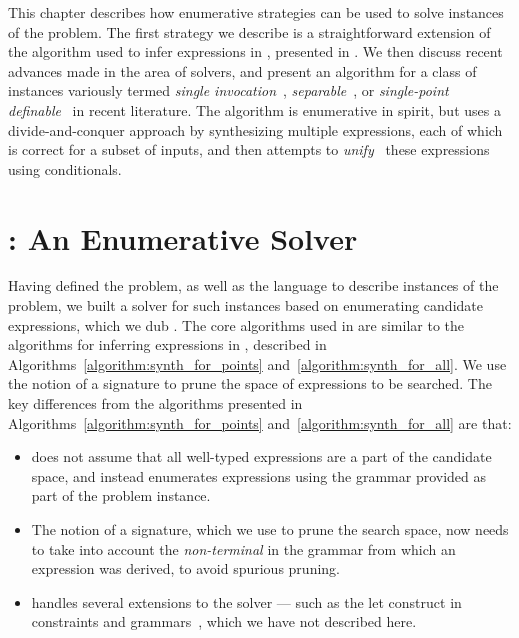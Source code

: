 This chapter describes how enumerative strategies can be used to solve
instances of the \sygusbody problem. The first strategy we describe is a
straightforward extension of the algorithm used to infer expressions
in \transit, presented in . We then
discuss recent advances made in the area of \sygusbody solvers, and
present an algorithm for a class of \sygusbody instances variously termed
\emph{single invocation}~\cite{reynolds-15},
\emph{separable}~\cite{radhakrishna-15}, or \emph{single-point
  definable}~\cite{madhusudan-16} in recent literature.  The
algorithm is enumerative in spirit, but uses a divide-and-conquer
approach by synthesizing multiple expressions, each of which is correct
for a subset of inputs, and then attempts to
\emph{unify}~\cite{radhakrishna-15} these expressions using conditionals.

\section[\tocsc{esolver}: An Enumerative \tocsf{SyGuS} Solver]
{: An Enumerative
   Solver}
\label{section:esolver}
Having defined the \sygusbody problem, as well as the language to describe
instances of the \sygusbody problem, we built a solver for such instances
based on enumerating candidate expressions, which we dub \esolver. The
core algorithms used in \esolver are similar to the algorithms for
inferring expressions in \transit, described in
Algorithms~\ref{algorithm:synth_for_points}
and~\ref{algorithm:synth_for_all}. We use the notion of a signature to
prune the space of expressions to be searched. The key differences from
the algorithms presented in
Algorithms~\ref{algorithm:synth_for_points}
and~\ref{algorithm:synth_for_all} are that:
\begin{itemize}
\item
\esolver does not assume
that all well-typed expressions are a part of the candidate space, and
instead enumerates expressions using the grammar provided as part of the
problem instance.
\item
The notion of a signature, which we use to prune the search space, now
needs to take into account the \emph{non-terminal} in the grammar from
which an expression was derived, to avoid spurious pruning.
\item
\esolver handles several extensions to the
\sygusbody solver --- such as the \textsf{let} construct in constraints
and grammars~\cite{raghothaman-sygus-spec}, which we have not
described here.
\end{itemize}

